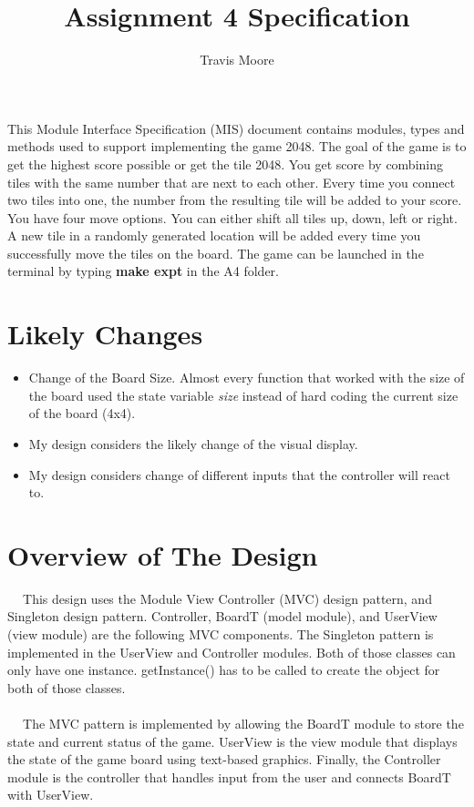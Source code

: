 \documentclass[12pt]{article}
\title{Assignment 4 Specification}
\author{Travis Moore}
\begin{document}
\maketitle
This Module Interface Specification (MIS) document contains modules, types and
methods used to support implementing the game 2048. The goal of the game is to get the highest score possible or get the tile 2048. You get score by combining tiles with the same number that are next to each other. Every time you connect two tiles into one, the number from the resulting tile will be added to your score. You have four move options. You can either shift all tiles up, down, left or right. A new tile in a randomly generated location will be added every time you successfully move the tiles on the board. The game can be launched in the terminal by typing \textbf{make expt} in the A4 folder.
\newpage
\section* {Likely Changes}

\begin{itemize}
    \item Change of the Board Size. Almost every function that worked with the size of the board used the state variable \textit{size} instead of hard coding the current size of the board (4x4).
    \item My design considers the likely change of the visual display. 
    \item My design considers change of different inputs that the controller will react to.
\end{itemize}

\section* {Overview of The Design}

$\ \ \ \ $ This design uses the Module View Controller (MVC) design pattern, and Singleton design pattern. Controller, BoardT (model module), and UserView (view module) are the following MVC components. The Singleton pattern is implemented in the UserView and Controller modules. Both of those classes can only have one instance. getInstance() has to be called to create the object for both of those classes.\\\\
$\ \ \ \ $ The MVC pattern is implemented by allowing the BoardT module to store the state and current status of the game. UserView is the view module that displays the state of the game board using text-based graphics. Finally, the Controller module is the controller that handles input from the user and connects BoardT with UserView. 
\end{document}
